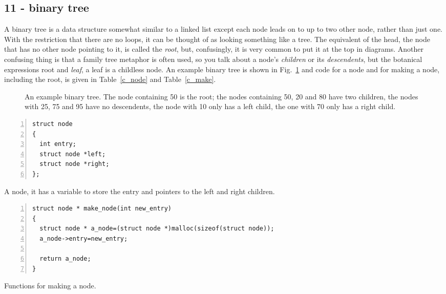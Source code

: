 \documentclass[11pt,a4paper]{scrartcl}
\begin{document}
\subsection*{11 - binary tree}


A binary tree is a data structure somewhat similar to a linked list
except each node leads on to up to two other node, rather than just
one. With the restriction that there are no loops, it can be thought
of as looking something like a tree. The equivalent of the head, the
node that has no other node pointing to it, is called the {\sl root},
but, confusingly, it is very common to put it at the top in
diagrams. Another confusing thing is that a family tree metaphor is
often used, so you talk about a node's {\sl children} or its {\sl
  descendents}, but the botanical expressions root and {\sl leaf}, a
leaf is a childless node. An example binary tree is shown in
Fig.~\ref{fig_example_tree} and code for a node and for making a node,
including the root, is given in Table~\ref{c_node} and
Table~\ref{c_make}.

\begin{figure}
\begin{center}
\end{center}
\caption{An example binary tree. The node containing 50 is the root; the nodes containing 50, 20 and 80 have two children, the nodes with 25, 75 and 95 have no descendents, the node with 10 only has a left child, the one with 70 only has a right child.\label{fig_example_tree}}
\end{figure}


\begin{table}
\begin{lstlisting}[numbers=left]
struct node
{
  int entry;
  struct node *left;
  struct node *right;
};
\end{lstlisting}
\caption{A node, it has a variable to store the entry and pointers to the left and right children. \label{c_node}}
\end{table}


\begin{table}
\begin{lstlisting}[numbers=left]
struct node * make_node(int new_entry)
{
  struct node * a_node=(struct node *)malloc(sizeof(struct node));
  a_node->entry=new_entry;

  return a_node;
}
\end{lstlisting}
\caption{Functions for making a node. \label{c_make}}
\end{table}
\end{document}
